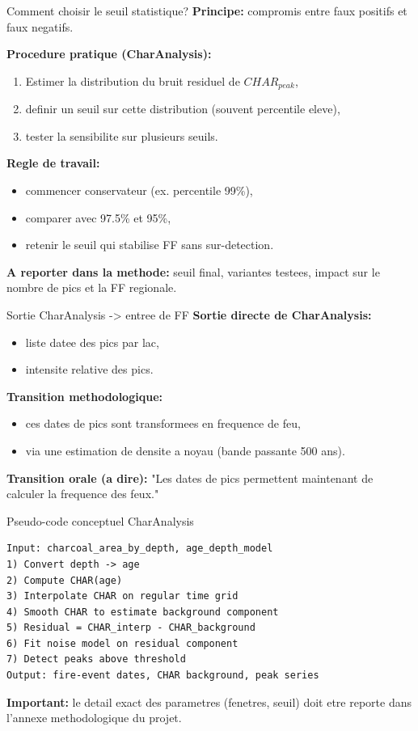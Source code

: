\documentclass[aspectratio=169,11pt]{beamer}
\begin{document}
\begin{frame}{Comment choisir le seuil statistique?}
\textbf{Principe:} compromis entre faux positifs et faux negatifs.

\textbf{Procedure pratique (CharAnalysis):}
\begin{enumerate}
  \item Estimer la distribution du bruit residuel de \(CHAR_{peak}\),
  \item definir un seuil sur cette distribution (souvent percentile eleve),
  \item tester la sensibilite sur plusieurs seuils.
\end{enumerate}

\textbf{Regle de travail:}
\begin{itemize}
  \item commencer conservateur (ex. percentile 99\%),
  \item comparer avec 97.5\% et 95\%,
  \item retenir le seuil qui stabilise FF sans sur-detection.
\end{itemize}

\textbf{A reporter dans la methode:} seuil final, variantes testees, impact sur le nombre de pics et la FF regionale.
\end{frame}

\begin{frame}{Sortie CharAnalysis -> entree de FF}
\textbf{Sortie directe de CharAnalysis:}
\begin{itemize}
  \item liste datee des pics par lac,
  \item intensite relative des pics.
\end{itemize}

\textbf{Transition methodologique:}
\begin{itemize}
  \item ces dates de pics sont transformees en frequence de feu,
  \item via une estimation de densite a noyau (bande passante 500 ans).
\end{itemize}

\textbf{Transition orale (a dire):} \alert{"Les dates de pics permettent maintenant de calculer la frequence des feux."}
\end{frame}

\begin{frame}[fragile]{Pseudo-code conceptuel CharAnalysis}
\footnotesize
\begin{verbatim}
Input: charcoal_area_by_depth, age_depth_model
1) Convert depth -> age
2) Compute CHAR(age)
3) Interpolate CHAR on regular time grid
4) Smooth CHAR to estimate background component
5) Residual = CHAR_interp - CHAR_background
6) Fit noise model on residual component
7) Detect peaks above threshold
Output: fire-event dates, CHAR background, peak series
\end{verbatim}

\normalsize
\textbf{Important:} le detail exact des parametres (fenetres, seuil) doit etre reporte dans l'annexe methodologique du projet.
\end{frame}
\end{document}
